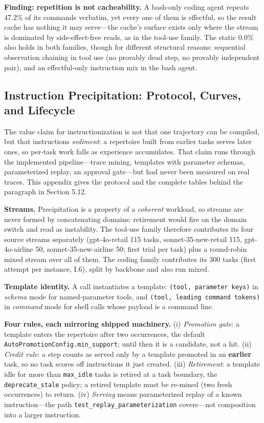 \documentclass[
  11pt,
]{article}
\begin{document}
\textbf{Finding: repetition is not cacheability.} A bash-only coding
agent repeats 47.2\% of its commands verbatim, yet every one of them is
effectful, so the result cache has nothing it may serve---the cache's
surface exists only where the stream is dominated by side-effect-free
reads, as in the tool-use family. The static 0.0\% also holds in both
families, though for different structural reasons: sequential
observation chaining in tool use (no provably dead step, no provably
independent pair), and an effectful-only instruction mix in the bash
agent.

\subsection{Instruction Precipitation: Protocol, Curves, and
Lifecycle}\label{instruction-precipitation-protocol-curves-and-lifecycle}

The value claim for instructionization is not that one trajectory can be
compiled, but that instructions \emph{sediment}: a repertoire built from
earlier tasks serves later ones, so per-task work falls as experience
accumulates. That claim runs through the implemented pipeline---trace
mining, templates with parameter schemas, parameterized replay, an
approval gate---but had never been measured on real traces. This
appendix gives the protocol and the complete tables behind the paragraph
in Section 5.12.

\textbf{Streams.} Precipitation is a property of a \emph{coherent}
workload, so streams are never formed by concatenating domains:
retirement would fire on the domain switch and read as instability. The
tool-use family therefore contributes its four source streams separately
(gpt-4o-retail 115 tasks, sonnet-35-new-retail 115, gpt-4o-airline 50,
sonnet-35-new-airline 50; first trial per task) plus a round-robin mixed
stream over all of them. The coding family contributes its 300 tasks
(first attempt per instance, I.6), split by backbone and also run mixed.

\textbf{Template identity.} A call instantiates a template:
\texttt{(tool,\ parameter\ keys)} in \emph{schema} mode for
named-parameter tools, and \texttt{(tool,\ leading\ command\ tokens)} in
\emph{command} mode for shell calls whose payload is a command line.

\textbf{Four rules, each mirroring shipped machinery.} (i)
\emph{Promotion gate}: a template enters the repertoire after two
occurrences, the default \texttt{AutoPromotionConfig.min\_support};
until then it is a candidate, not a hit. (ii) \emph{Credit rule}: a step
counts as served only by a template promoted in an \textbf{earlier}
task, so no task scores off instructions it just created. (iii)
\emph{Retirement}: a template idle for more than \texttt{max\_idle}
tasks is retired at a task boundary, the \texttt{deprecate\_stale}
policy; a retired template must be re-mined (two fresh occurrences) to
return. (iv) \emph{Serving} means parameterized replay of a known
instruction---the path \texttt{test\_replay\_parameterization}
covers---not composition into a larger instruction.
\end{document}
